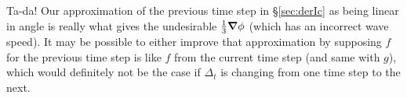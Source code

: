Ta-da! Our approximation of the previous time step in \S\ref{sec:derIc} as
being linear in angle is really what gives the undesirable $\frac13\bm{\nabla}\phi$
(which has an incorrect wave speed). It may be possible to either improve that
approximation by supposing $f$ for the previous time step is like $f$ from the
current time step (and same with $g$), which would definitely not be the case
if $\Delta_t$ is changing from one time step to the next.

